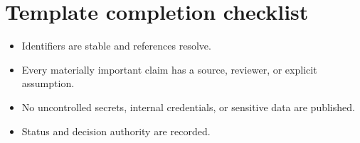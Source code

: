 \documentclass[10pt,letterpaper]{article}
\begin{document}
\section{Template completion checklist}
\begin{itemize}
\item Identifiers are stable and references resolve.
\item Every materially important claim has a source, reviewer, or explicit assumption.
\item No uncontrolled secrets, internal credentials, or sensitive data are published.
\item Status and decision authority are recorded.
\end{itemize}
\end{document}
